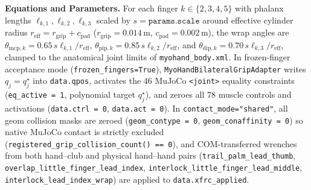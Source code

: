 \documentclass[11pt,a4paper]{article}
\begin{document}
\textbf{Equations and Parameters.}
For each finger $k \in \{2,3,4,5\}$ with phalanx lengths $\ell_{k,1}, \ell_{k,2}, \ell_{k,3}$ scaled by $s = \texttt{params.scale}$ around effective cylinder radius $r_{\mathrm{eff}} = r_{\mathrm{grip}} + c_{\mathrm{pad}}$ ($r_{\mathrm{grip}} = 0.014\,\mathrm{m}$, $c_{\mathrm{pad}} = 0.002\,\mathrm{m}$), the wrap angles are $\theta_{\mathrm{mcp},k} = 0.65\,s\ell_{k,1}/r_{\mathrm{eff}}$, $\theta_{\mathrm{pip},k} = 0.85\,s\ell_{k,2}/r_{\mathrm{eff}}$, and $\theta_{\mathrm{dip},k} = 0.70\,s\ell_{k,3}/r_{\mathrm{eff}}$, clamped to the anatomical joint limits of \texttt{myohand\_body.xml}. In frozen-finger acceptance mode (\texttt{frozen\_fingers=True}), \texttt{MyoHandBilateralGripAdapter} writes $q_j = q_j^{\star}$ into \texttt{data.qpos}, activates the $46$ MuJoCo \texttt{<joint>} equality constraints (\texttt{eq\_active = 1}, polynomial target $q_j^{\star}$), and zeroes all $78$ muscle controls and activations (\texttt{data.ctrl = 0}, \texttt{data.act = 0}). In \texttt{contact\_mode="shared"}, all geom collision masks are zeroed (\texttt{geom\_contype = 0}, \texttt{geom\_conaffinity = 0}) so native MuJoCo contact is strictly excluded (\texttt{registered\_grip\_collision\_count() == 0}), and COM-transferred wrenches from both hand--club and physical hand--hand pairs (\texttt{trail\_palm\_lead\_thumb}, \texttt{overlap\_little\_finger\_lead\_index}, \texttt{interlock\_little\_finger\_lead\_middle}, \texttt{interlock\_lead\_index\_wrap}) are applied to \texttt{data.xfrc\_applied}.
\end{document}
